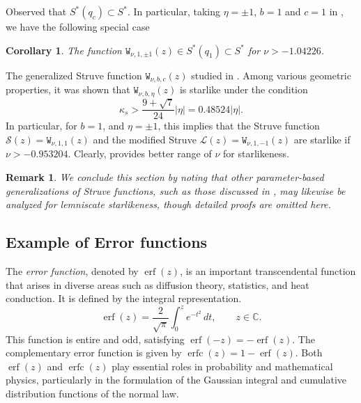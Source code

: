 \documentclass[a4paper,11pt,reqno]{amsart}
\newtheorem{corollary}{Corollary}[section]
\newtheorem{remark}{Remark}[section]
\begin{document}
Observed that $S^{\ast}(q_c) \subset S^{\ast}$. In particular, taking $\eta= \pm 1$, $b=1$ and $c=1$ in , we have the following special case
\begin{corollary}\label{cor:Lem-GStruve}
The function  $\mathtt{W}_{\nu, 1, \pm 1}(z) \in S^{\ast}(q_1) \subset S^{\ast}$ for $\nu> -1.04226$. 
\end{corollary}

The generalized Struve function $\mathtt{W}_{\nu, b, c}(z)$ studied  in \cite{Yagmur-Orhan, Orhan-Yagmur}. Among various geometric properties, it was shown that $\mathtt{W}_{\nu, b, \eta}(z)$ is starlike  under the condition  
\[
\kappa_s >\frac{9 + \sqrt{ 7}}{24} |\eta|= 0.48524 |\eta| .
\]  
In particular, for  $b = 1$, and $\eta = \pm 1$, this implies that the Struve function $\mathcal{S}(z)=\mathtt{W}_{\nu, 1, 1}(z)$ and the modified Struve $\mathcal{L}(z)=\mathtt{W}_{\nu, 1, -1}(z)$ are starlike if $\nu > -0.953204$. Clearly,  provides better range of $\nu$ for starlikeness. 
\begin{remark}
  We conclude this section by noting that other parameter-based generalizations of Struve functions, such as those discussed in \cite{Ali-Mondal-Nisar, sarkar2024geometric}, may likewise be analyzed for lemniscate starlikeness, though detailed proofs are omitted here.
\end{remark}







\subsection{Example of Error functions}\label{sec:Appl-error}
The \emph{error function}, denoted by $\operatorname{erf}(z)$, is an important transcendental function that arises in diverse areas such as diffusion theory, statistics, and heat conduction. It is defined by the integral representation.
\begin{equation}\label{eq:erf-def}
\operatorname{erf}(z) = \frac{2}{\sqrt{\pi}} \int_{0}^{z} e^{-t^{2}}\, dt, \qquad z \in \mathbb{C}.
\end{equation}
This function is entire and odd, satisfying $\operatorname{erf}(-z) = -\operatorname{erf}(z)$. The complementary error function is given by $\operatorname{erfc}(z) = 1 - \operatorname{erf}(z)$. Both $\operatorname{erf}(z)$ and $\operatorname{erfc}(z)$ play essential roles in probability and mathematical physics, particularly in the formulation of the Gaussian integral and cumulative distribution functions of the normal law.
\end{document}
